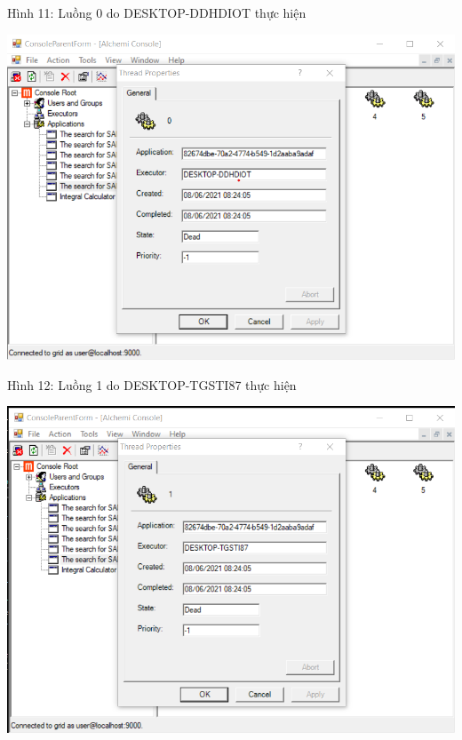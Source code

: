 \documentclass[12pt,a4paper]{article}
\begin{document}
Hình 11: Luồng 0 do DESKTOP-DDHDIOT thực hiện
\begin{center}
\includegraphics[scale=0.85]{1.0.png}
\end{center}



Hình 12: Luồng 1 do DESKTOP-TGSTI87 thực hiện
\begin{center}
\includegraphics[scale=0.85]{1.1.png}
\end{center}
\end{document}
